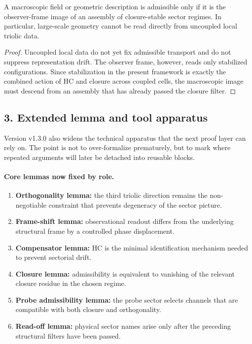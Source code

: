 \begin{proposition}
\label{prop:macro-requires-closure-assembly}
A macroscopic field or geometric description is admissible only if it is the
observer-frame image of an assembly of closure-stable sector regimes. In
particular, large-scale geometry cannot be read directly from uncoupled local
triolic data.
\end{proposition}

\begin{proof}
Uncoupled local data do not yet fix admissible transport and do not suppress
representation drift. The observer frame, however, reads only stabilized
configurations. Since stabilization in the present framework is exactly the
combined action of HC and closure across coupled cells, the macroscopic image
must descend from an assembly that has already passed the closure filter.
\end{proof}

\subsection*{3. Extended lemma and tool apparatus}
Version v1.3.0 also widens the technical apparatus that the next proof
layer can rely on. The point is not to over-formalize prematurely, but to mark
where repeated arguments will later be detached into reusable blocks.

\paragraph{Core lemmas now fixed by role.}
\begin{enumerate}[leftmargin=2em]
  \item \textbf{Orthogonality lemma:} the third triolic direction remains the
  non-negotiable constraint that prevents degeneracy of the sector picture.
  \item \textbf{Frame-shift lemma:} observational readout differs from the
  underlying structural frame by a controlled phase displacement.
  \item \textbf{Compensator lemma:} HC is the minimal identification mechanism
  needed to prevent sectorial drift.
  \item \textbf{Closure lemma:} admissibility is equivalent to vanishing of the
  relevant closure residue in the chosen regime.
  \item \textbf{Probe admissibility lemma:} the probe sector selects channels
  that are compatible with both closure and orthogonality.
  \item \textbf{Read-off lemma:} physical sector names arise only after the
  preceding structural filters have been passed.
\end{enumerate}

